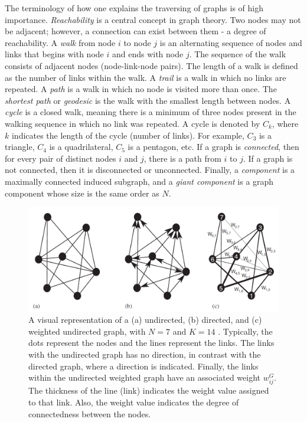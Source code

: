 The terminology of how one explains the traversing of graphs is of high importance. \textit{Reachability} is a central concept in graph theory. Two nodes may not be adjacent; however, a connection can exist between them - a degree of reachability. A \textit{walk} from node $i$ to node $j$ is an alternating sequence of nodes and links that begins with node $i$ and ends with node $j$. The sequence of the walk consists of adjacent nodes (node-link-node pairs). The length of a walk is defined as the number of links within the walk. A \textit{trail} is a walk in which no links are repeated. A \textit{path} is a walk in which no node is visited more than once. The \textit{shortest path} or \textit{geodesic} is the walk with the smallest length between nodes. A \textit{cycle} is a closed walk, meaning there is a minimum of three nodes present in the walking sequence in which no link was repeated. A cycle is denoted by $C_k$, where $k$ indicates the length of the cycle (number of links). For example, $C_3$ is a triangle, $C_4$ is a quadrilateral, $C_5$ is a pentagon, etc. If a graph is \textit{connected}, then for every pair of distinct nodes $i$ and $j$, there is a path from $i$ to $j$. If a graph is not connected, then it is disconnected or unconnected. Finally, a \textit{component} is a maximally connected induced subgraph, and a \textit{giant component} is a graph component whose size is the same order as $N$.


\begin{figure}[h]
	\begin{center}
		\includegraphics[scale=0.75]{fig/CH2/graph_types_03.PNG}
		\caption{A visual representation of a (a) undirected, (b) directed, and (c) weighted undirected graph, with $N = 7$ and $K = 14$ \citep{boccaletti2006complex}. Typically, the dots represent the nodes and the lines represent the links. The links with the undirected graph has no direction, in contrast with the directed graph, where a direction is indicated. Finally, the links within the undirected weighted graph have an associated weight $w^G_{ij}$. The thickness of the line (link) indicates the weight value assigned to that link. Also, the weight value indicates the degree of connectedness between the nodes.}
		\label{fig:ch2_graph_types}
	\end{center}	
\end{figure}

